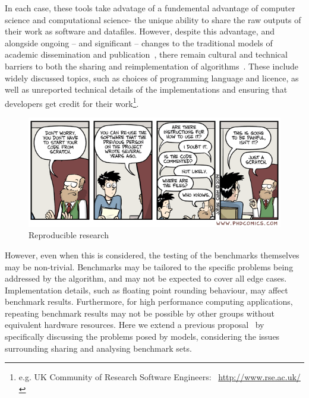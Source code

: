 \documentclass[conference]{IEEEtran}
\begin{document}
In each case, these tools take advatage of a fundemental advantage
of computer science and computational science- the unique ability to
share the raw outputs of their work as software and datafiles. However, 
despite this advantage, and alongside
ongoing -- and significant -- changes to the traditional models of
academic dissemination and
publication~\cite{deroure:2010,stodden-et-al:2013,fursin+dubach:2014},
there remain cultural and technical barriers to both the sharing and
reimplementation of algorithms~\cite{crick-et-al_wssspe2}. These
include widely discussed topics, such as choices of programming
language and licence, as well as unreported technical details of the
implementations and ensuring that developers get credit for their
work\footnote{e.g. UK Community of Research Software Engineers:
  ~\url{http://www.rse.ac.uk/}}.


\begin{figure}[!ht]
\centering
\includegraphics[width=\columnwidth]{phd031214s.png}
\caption{Reproducible research\newline [source: \url{http://www.phdcomics.com/comics.php?f=1689}]}
\label{fig:reprodres} 
\end{figure}

However, even when this is considered, the testing of the benchmarks
themselves may be non-trivial. Benchmarks may be tailored to the
specific problems being addressed by the algorithm, and may not be
expected to cover all edge cases. Implementation details, such as
floating point rounding behaviour, may affect benchmark results.
Furthermore, for high performance computing applications, repeating
benchmark results may not be possible by other groups without
equivalent hardware resources. Here we extend a previous
proposal~\cite{crick-et-al_wssspe2} by specifically discussing the 
problems posed by models, considering the issues surrounding sharing
and analysing benchmark sets.
\end{document}
